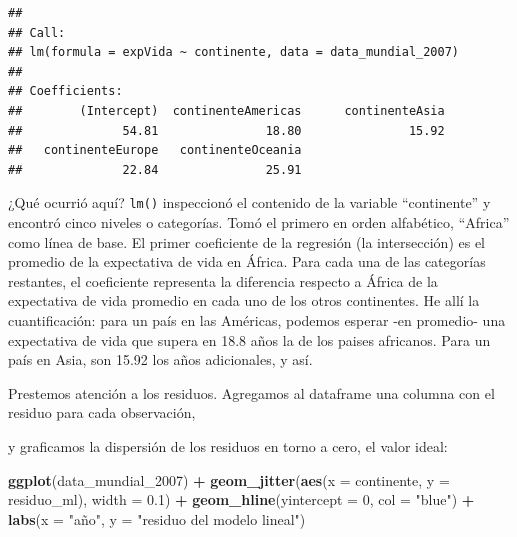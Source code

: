 \documentclass[spanish,]{book}
\newenvironment{Shaded}{\begin{snugshade}}{\end{snugshade}}
\newcommand{\DataTypeTok}[1]{\textcolor[rgb]{0.13,0.29,0.53}{#1}}
\newcommand{\DecValTok}[1]{\textcolor[rgb]{0.00,0.00,0.81}{#1}}
\newcommand{\FloatTok}[1]{\textcolor[rgb]{0.00,0.00,0.81}{#1}}
\newcommand{\KeywordTok}[1]{\textcolor[rgb]{0.13,0.29,0.53}{\textbf{#1}}}
\newcommand{\NormalTok}[1]{#1}
\newcommand{\OperatorTok}[1]{\textcolor[rgb]{0.81,0.36,0.00}{\textbf{#1}}}
\newcommand{\StringTok}[1]{\textcolor[rgb]{0.31,0.60,0.02}{#1}}
\begin{document}
\begin{verbatim}
## 
## Call:
## lm(formula = expVida ~ continente, data = data_mundial_2007)
## 
## Coefficients:
##        (Intercept)  continenteAmericas      continenteAsia  
##              54.81               18.80               15.92  
##   continenteEurope   continenteOceania  
##              22.84               25.91
\end{verbatim}

¿Qué ocurrió aquí? \texttt{lm()} inspeccionó el contenido de la variable ``continente'' y encontró cinco niveles o categorías. Tomó el primero en orden alfabético, ``Africa'' como línea de base. El primer coeficiente de la regresión (la intersección) es el promedio de la expectativa de vida en África. Para cada una de las categorías restantes, el coeficiente representa la diferencia respecto a África de la expectativa de vida promedio en cada uno de los otros continentes. He allí la cuantificación: para un país en las Américas, podemos esperar -en promedio- una expectativa de vida que supera en 18.8 años la de los paises africanos. Para un país en Asia, son 15.92 los años adicionales, y así.

Prestemos atención a los residuos. Agregamos al dataframe una columna con el residuo para cada observación,

\begin{Shaded}
\end{Shaded}

y graficamos la dispersión de los residuos en torno a cero, el valor ideal:

\begin{Shaded}
\begin{Highlighting}[]
\KeywordTok{ggplot}\NormalTok{(data_mundial_}\DecValTok{2007}\NormalTok{) }\OperatorTok{+}
\StringTok{    }\KeywordTok{geom_jitter}\NormalTok{(}\KeywordTok{aes}\NormalTok{(}\DataTypeTok{x =}\NormalTok{ continente, }\DataTypeTok{y =}\NormalTok{ residuo_ml), }\DataTypeTok{width =} \FloatTok{0.1}\NormalTok{) }\OperatorTok{+}
\StringTok{    }\KeywordTok{geom_hline}\NormalTok{(}\DataTypeTok{yintercept =} \DecValTok{0}\NormalTok{, }\DataTypeTok{col =} \StringTok{"blue"}\NormalTok{) }\OperatorTok{+}
\StringTok{    }\KeywordTok{labs}\NormalTok{(}\DataTypeTok{x =} \StringTok{"año"}\NormalTok{, }\DataTypeTok{y =} \StringTok{"residuo del modelo lineal"}\NormalTok{)}
\end{Highlighting}
\end{Shaded}
\end{document}
